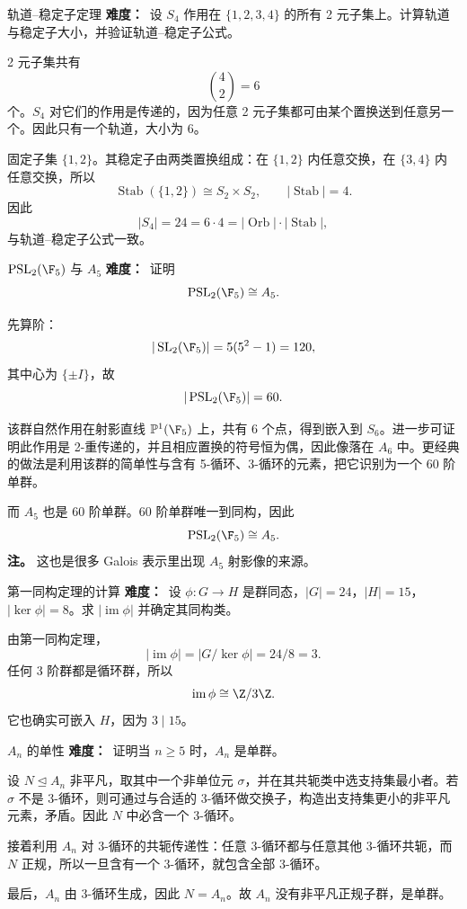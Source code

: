 \begin{problem}{轨道--稳定子定理}
\textbf{难度：}\medium\ 设 $S_4$ 作用在 $\{1,2,3,4\}$ 的所有 2 元子集上。计算轨道与稳定子大小，并验证轨道--稳定子公式。
\end{problem}
\begin{solution}
2 元子集共有
\[
\binom42=6
\]
个。$S_4$ 对它们的作用是传递的，因为任意 2 元子集都可由某个置换送到任意另一个。因此只有一个轨道，大小为 $6$。

固定子集 $\{1,2\}$。其稳定子由两类置换组成：在 $\{1,2\}$ 内任意交换，在 $\{3,4\}$ 内任意交换，所以
\[
\operatorname{Stab}(\{1,2\})\cong S_2\times S_2,
\qquad |\operatorname{Stab}|=4.
\]
因此
\[
|S_4|=24=6\cdot4=|\operatorname{Orb}|\cdot|\operatorname{Stab}|,
\]
与轨道--稳定子公式一致。
\end{solution}

\begin{problem}{$\operatorname{PSL}_2(\F_5)$ 与 $A_5$}
\textbf{难度：}\medium\ 证明
\[
\operatorname{PSL}_2(\F_5)\cong A_5.
\]
\end{problem}
\begin{solution}
先算阶：
\[
|\operatorname{SL}_2(\F_5)|=5(5^2-1)=120,
\]
其中心为 $\{\pm I\}$，故
\[
|\operatorname{PSL}_2(\F_5)|=60.
\]

该群自然作用在射影直线 $\mathbb P^1(\F_5)$ 上，共有 $6$ 个点，得到嵌入到 $S_6$。进一步可证明此作用是 2-重传递的，并且相应置换的符号恒为偶，因此像落在 $A_6$ 中。更经典的做法是利用该群的简单性与含有 5-循环、3-循环的元素，把它识别为一个 60 阶单群。

而 $A_5$ 也是 60 阶单群。60 阶单群唯一到同构，因此
\[
\operatorname{PSL}_2(\F_5)\cong A_5.
\]
\textbf{注。} 这也是很多 Galois 表示里出现 $A_5$ 射影像的来源。
\end{solution}

\begin{problem}{第一同构定理的计算}
\textbf{难度：}\medium\ 设 $\phi:G\to H$ 是群同态，$|G|=24$，$|H|=15$，$|\ker\phi|=8$。求 $|\operatorname{im}\phi|$ 并确定其同构类。
\end{problem}
\begin{solution}
由第一同构定理，
\[
|\operatorname{im}\phi|=|G/\ker\phi|=24/8=3.
\]
任何 3 阶群都是循环群，所以
\[
\operatorname{im}\phi\cong \Z/3\Z.
\]
它也确实可嵌入 $H$，因为 $3\mid15$。
\end{solution}

\begin{problem}{$A_n$ 的单性}
\textbf{难度：}\hard\ 证明当 $n\ge5$ 时，$A_n$ 是单群。
\end{problem}
\begin{solution}
设 $N\trianglelefteq A_n$ 非平凡，取其中一个非单位元 $\sigma$，并在其共轭类中选支持集最小者。若 $\sigma$ 不是 3-循环，则可通过与合适的 3-循环做交换子，构造出支持集更小的非平凡元素，矛盾。因此 $N$ 中必含一个 3-循环。

接着利用 $A_n$ 对 3-循环的共轭传递性：任意 3-循环都与任意其他 3-循环共轭，而 $N$ 正规，所以一旦含有一个 3-循环，就包含全部 3-循环。

最后，$A_n$ 由 3-循环生成，因此 $N=A_n$。故 $A_n$ 没有非平凡正规子群，是单群。
\end{solution}


